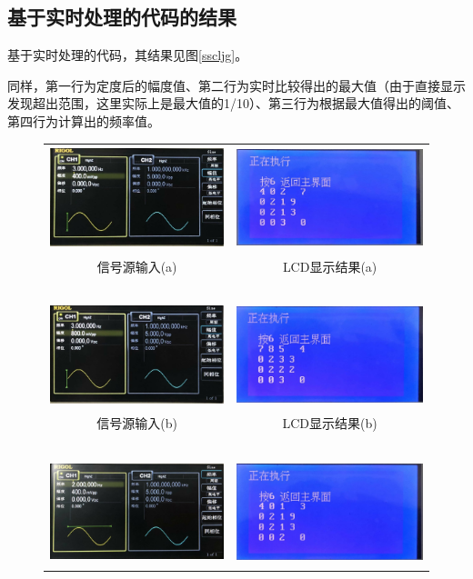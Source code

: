 \documentclass[12pt]{article}
\begin{document}
\subsection{基于实时处理的代码的结果}
基于实时处理的代码，其结果见图\ref{sscljg}。\par
同样，第一行为定度后的幅度值、第二行为实时比较得出的最大值（由于直接显示发现超出范围，这里实际上是最大值的1/10）、第三行为根据最大值得出的阈值、第四行为计算出的频率值。
\begin{figure}[htbp]
  \centering
  \begin{tabular}{cc}
  \includegraphics[height=3cm]{04}&\includegraphics[height=3cm]{12}\\
  信号源输入(a)&LCD显示结果(a)\\
   \ &\ \\
    \includegraphics[height=3cm]{05}&\includegraphics[height=3cm]{06}\\
  信号源输入(b)&LCD显示结果(b)\\
   \ &\ \\
      \includegraphics[height=3cm]{07}&\includegraphics[height=3cm]{11}\\

\end{tabular}
\end{figure}
\end{document}
